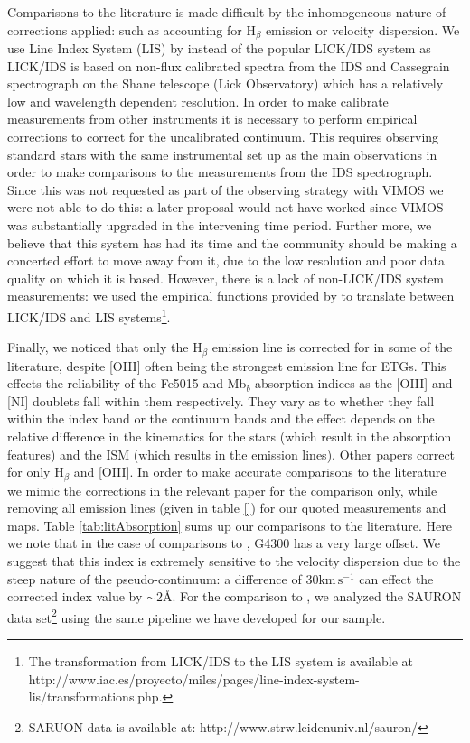 	Comparisons to the literature is made difficult by the inhomogeneous nature of corrections applied: such as accounting for H$_\beta$ emission or velocity dispersion. We use Line Index System (LIS) by \citet{Vazdekis2010} instead of the popular LICK/IDS system \citep{Faber1985, Worthey1994} as LICK/IDS is based on non-flux calibrated spectra from the IDS and Cassegrain spectrograph on the Shane telescope (Lick Observatory) which has a relatively low and wavelength dependent resolution. In order to make calibrate measurements from other instruments it is necessary to perform empirical corrections to correct for the uncalibrated continuum. This requires observing standard stars with the same instrumental set up as the main observations in order to make comparisons to the measurements from the IDS spectrograph. Since this was not requested as part of the observing strategy with VIMOS we were not able to do this: a later proposal would not have worked since VIMOS was substantially upgraded in the intervening time period. Further more, we believe that this system has had its time and the community should be making a concerted effort to move away from it, due to the low resolution and poor data quality on which it is based. However, there is a lack of non-LICK/IDS system measurements: we used the empirical functions provided by \citet{Vazdekis2010} to translate between LICK/IDS and LIS systems\footnote{The transformation from LICK/IDS to the LIS system is available at http://www.iac.es/proyecto/miles/pages/line-index-system-lis/transformations.php.}. 


	Finally, we noticed that only the H$_\beta$ emission line is corrected for in some of the literature, despite [OIII] often being the strongest emission line for ETGs. This effects the reliability of the Fe5015 and Mb$_b$ absorption indices as the [OIII] and [NI] doublets fall within them respectively. They vary as to whether they fall within the index band or the continuum bands and the effect depends on the relative difference in the kinematics for the stars (which result in the absorption features) and the ISM (which results in the emission lines). Other papers correct for only H$_\beta$ and [OIII]. In order to make accurate comparisons to the literature we mimic the corrections in the relevant paper for the comparison only, while removing all emission lines (given in table \ref{}) for our quoted measurements and maps. Table \ref{tab:litAbsorption} sums up our comparisons to the literature. Here we note that in the case of comparisons to \citet{Rampazzo2005}, G4300 has a very large offset. We suggest that this index is extremely sensitive to the velocity dispersion due to the steep nature of the pseudo-continuum: a difference of $30 \mathrm{km \, s^{-1}}$ can effect the corrected index value by $\sim 2$\AA. For the comparison to \citet{Vazdekis2010}, we analyzed the SAURON data set\footnote{SARUON data is available at: http://www.strw.leidenuniv.nl/sauron/} \citep{Emsellem2004} using the same pipeline we have developed for our sample. 

